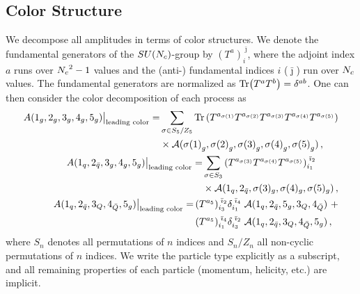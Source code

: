\subsection{Color Structure}
\label{5parton:sec:color_structures}
We decompose all amplitudes in terms of color structures. 
We denote the fundamental generators of the
$SU({N_c})$-group by $(T^a)^{\;\bar{\jmath}}_{i}$, where the
adjoint index $a$ runs over ${N_c}^2-1$ values and the 
(anti-) fundamental indices $i$  ($\bar \jmath$)
run over ${N_c}$ values. The fundamental generators are normalized
as $ \Tr(T^a T^b) = \delta^{ab}$. One can then consider the color decomposition of
each process as
%
\begin{align}
  \begin{split}
    \label{eq:ColorDecG}
    A(1_g, 2_g, 3_g, 4_g, 5_g) \big\vert_{\textrm{leading color}} = &
    \sum_{\sigma\in S_5/Z_5} \Tr\left(
    T^{a_{\sigma(1)}} T^{a_{\sigma(2)}} 
    T^{a_{\sigma(3)}} T^{a_{\sigma(4)}} T^{a_{\sigma(5)}} \right)\\
    &\times \mathcal{A}({\sigma(1)}_g, {\sigma(2)}_g, {\sigma(3)}_g, {\sigma(4)}_g, {\sigma(5)}_g)\,, 
  \end{split} \\
  \begin{split}
    \label{eq:ColorDec2Q}
    A(1_q, 2_{\bar{q}}, 3_g, 4_g, 5_g) \big\vert_{\textrm{leading color}} 
    = & \sum_{\sigma\in S_3} 
    \left( T^{a_{\sigma(3)}} T^{a_{\sigma(4)}} T^{a_{\sigma(5)}} \right)^{\;\bar{\imath}_2}_{i_1} \\
    & \times\mathcal{A}(1_q,2_{\bar{q}},\sigma(3)_g,\sigma(4)_g,\sigma(5)_g)\,,
  \end{split}\\
  \begin{split}
    \label{eq:ColorDec4Q}
    A(1_q, 2_{\bar{q}}, 3_Q, 4_{\bar{Q}}, 5_g)
    \big\vert_{\textrm{leading color}} 
    = & 
    \,(T^{a_5})^{\;\bar{\imath}_{2}}_{i_{3}} \delta^{\;\bar{\imath}_{4}}_{i_{1}}\;
    \mathcal{A}(1_{q}, 2_{\bar{q}}, 5_g, 3_{Q}, 4_{\bar{Q}}) \,\,+  \\
    & \,(T^{a_5})^{\;\bar{\imath}_{4}}_{i_{1}} \delta^{\;\bar{\imath}_{2}}_{i_{3}}\;
    \mathcal{A}(1_{q},2_{\bar{q}},3_{Q},4_{\bar{Q}},5_g) \,,
  \end{split}
\end{align}
where $S_n$ denotes all permutations of $n$ indices and 
$S_n/Z_n$ all non-cyclic permutations of $n$ indices. 
We write the particle type explicitly as a subscript, and all
remaining properties of each particle (momentum, helicity, 
etc.\@) are implicit. 

